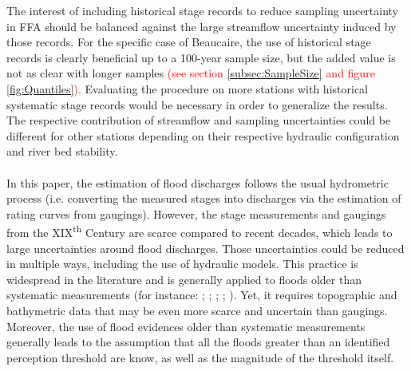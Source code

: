 \documentclass[11pt]{article}
\begin{document}
    The interest of including historical stage records to reduce sampling uncertainty in FFA should be balanced against the large streamflow uncertainty induced by those records. For the specific case of Beaucaire, the use of historical stage records is clearly beneficial up to a 100-year sample size, but the added value is not as clear with longer samples \textcolor{red}{(see section \ref{subsec:SampleSize} and figure \ref{fig:Quantiles}).} Evaluating the procedure on more stations with historical systematic stage records would be necessary in order to generalize the results. The respective contribution of streamflow and sampling uncertainties could be different for other stations depending on their respective hydraulic configuration and river bed stability.    
    \paragraph{}
    In this paper, the estimation of flood discharges follows the usual hydrometric process (i.e. converting the measured stages into discharges via the estimation of rating curves from gaugings). However, the stage measurements and gaugings from the XIX\textsuperscript{th} Century are scarce compared to recent decades, which leads to large uncertainties around flood discharges. Those uncertainties could be reduced in multiple ways, including the use of hydraulic models. This practice is widespread in the literature and is generally applied to floods older than systematic measurements (for instance: \citet{naulet_flood_2005}; \citet{neppel_flood_2010}; \citet{machado_flood_2015}; \citet{ruiz-bellet_uncertainty_2017}; \citet{van_der_meulen_late_2021}). Yet, it requires topographic and bathymetric data that may be even more scarce and uncertain than gaugings. Moreover, the use of flood evidences older than systematic measurements generally leads to the assumption that all the floods greater than an identified perception threshold are know, as well as the magnitude of the threshold itself.
    
\end{document}
